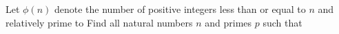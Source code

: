 Let $\phi(n)$ denote the number of positive integers less than or equal to $n$ and relatively prime to  Find all natural numbers $n$ and primes $p$ such that 